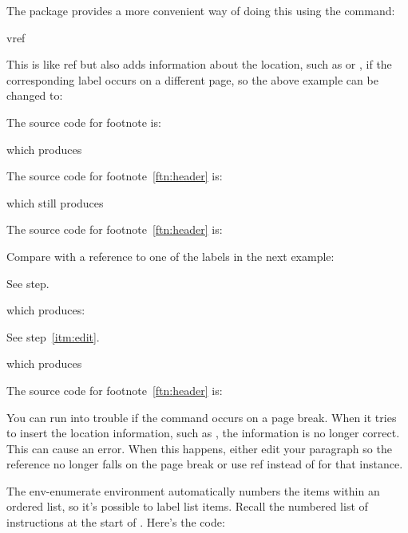 The  package provides a more convenient way of doing this using the
command:
\begin{definition}
\gls{vref}
\end{definition}
This is like \gls{ref} but also adds information about the location, 
such as  or , if the
corresponding \gls{label} occurs on a different page, so the above
example can be changed to:
\begin{codeS}
The source code for footnote is:
\end{codeS}
\begin{latexonly}
\ifscreenorother
{%
which produces
\begin{resultS}
The source code for footnote~\vref{ftn:header} is:
\end{resultS}
}%
{%
\bookpagebreak\noindent which still produces
\begin{resultS}
The source code for footnote~\vref{ftn:header} is:
\end{resultS}
Compare with a reference to one of the labels in the next example:
\begin{codeS}
See step.
\end{codeS}
which produces:
\begin{resultS}
See step~\vref{itm:edit}.
\end{resultS}
}%
\end{latexonly}
\begin{htmlonly}
which produces
\begin{resultS}
The source code for footnote~\vref{ftn:header} is:
\end{resultS}
\end{htmlonly}

You can run into trouble if the  command occurs on a
page break. When it tries to insert the location information, such
as , the information is no longer correct. This
can cause an  error. When this happens, either
edit your paragraph so the reference no longer falls on the page
break or use \gls{ref} instead of  for that instance.


The \gls{env-enumerate} environment %
automatically numbers the items within an ordered list, so it's
possible to label list items. Recall the numbered list of
instructions at the start of
. Here's the code:

